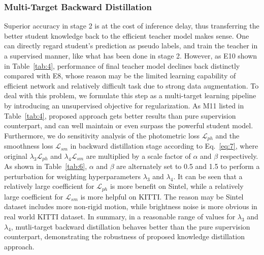 \documentclass[lettersize,journal]{IEEEtran}
\begin{document}
\subsubsection{Multi-Target Backward Distillation}
Superior accuracy in stage 2 is at the cost of inference delay, thus transferring the better student knowledge back to the efficient teacher model makes sense. One can directly regard student's prediction as pseudo labels, and train the teacher in a supervised manner, like what has been done in stage 2. However, as E10 shown in Table~\ref{tab:4}, performance of final teacher model declines back distinctly compared with E8, whose reason may be the limited learning capability of efficient network and relatively difficult task due to strong data augmentation. To deal with this problem, we formulate this step as a multi-target learning pipeline by introducing an unsupervised objective for regularization. As M11 listed in Table~\ref{tab:4}, proposed approach gets better results than pure supervision counterpart, and can well maintain or even surpass the powerful student model. Furthermore, we do sensitivity analysis of the photometric loss $\mathcal{L}_{ph}$ and the smoothness loss $\mathcal{L}_{sm}$ in backward distillation stage according to Eq.~\ref{eq:7}, where original $\lambda_3 \mathcal{L}_{ph}$ and $\lambda_4 \mathcal{L}_{sm}$ are multiplied by a scale factor of $\alpha$ and $\beta$ respectively. As shown in Table~\ref{tab:6}, $\alpha$ and $\beta$ are alternately set to 0.5 and 1.5 to perform a perturbation for weighting hyperparameters $\lambda_3$ and $\lambda_4$. It can be seen that a relatively large coefficient for $\mathcal{L}_{ph}$ is more benefit on Sintel, while a relatively large coefficient for $\mathcal{L}_{sm}$ is more helpful on KITTI. The reason may be Sintel dataset includes more non-rigid motion, while brightness noise is more obvious in real world KITTI dataset. In summary, in a reasonable range of values for $\lambda_3$ and $\lambda_4$, mutli-target backward distillation behaves better than the pure supervision counterpart, demonstrating the robustness of proposed knowledge distillation approach.
\end{document}
